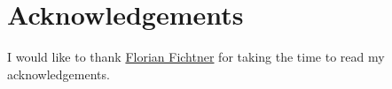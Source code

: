 
\chapter*{Acknowledgements}

I would like to thank \ul{Florian Fichtner} for taking the time to read my acknowledgements.



 